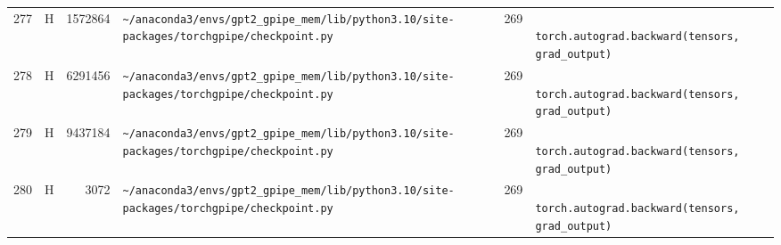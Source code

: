 \documentclass{article}
\begin{document}
\begin{longtable}{r l r p{6.5cm} r p{7.0cm}}
277 & H & 1572864 & \lstinline|~/anaconda3/envs/gpt2_gpipe_mem/lib/python3.10/site-packages/torchgpipe/checkpoint.py| & 269 & \lstinline|            torch.autograd.backward(tensors, grad_output)| \\
278 & H & 6291456 & \lstinline|~/anaconda3/envs/gpt2_gpipe_mem/lib/python3.10/site-packages/torchgpipe/checkpoint.py| & 269 & \lstinline|            torch.autograd.backward(tensors, grad_output)| \\
279 & H & 9437184 & \lstinline|~/anaconda3/envs/gpt2_gpipe_mem/lib/python3.10/site-packages/torchgpipe/checkpoint.py| & 269 & \lstinline|            torch.autograd.backward(tensors, grad_output)| \\
280 & H & 3072 & \lstinline|~/anaconda3/envs/gpt2_gpipe_mem/lib/python3.10/site-packages/torchgpipe/checkpoint.py| & 269 & \lstinline|            torch.autograd.backward(tensors, grad_output)| \\
\end{longtable}
\end{document}
